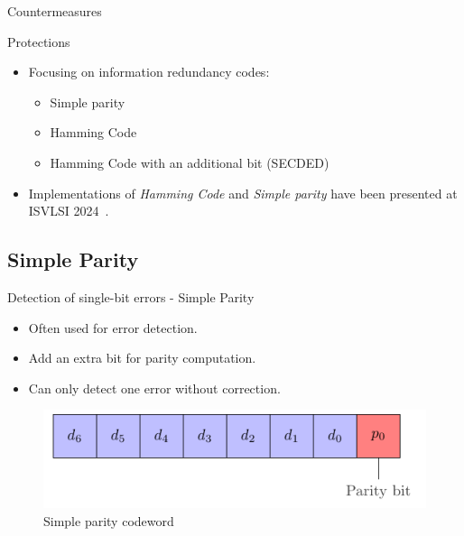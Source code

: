 \begin{frame}{Countermeasures}
    \begin{block}{Protections}
        \begin{itemize}
            \item Focusing on information redundancy codes:
            \begin{itemize}
                \item Simple parity
                \item Hamming Code
                \item Hamming Code with an additional bit (SECDED)
            \end{itemize}
            \item Implementations of \textit{Hamming Code} and \textit{Simple parity} have been presented at ISVLSI 2024~\cite{PRLG-24-isvlsi}.
        \end{itemize}
    \end{block}
\end{frame}
\subsection{Simple Parity}
    \begin{frame}{Detection of single-bit errors - Simple Parity}
        \begin{block}{}
            \begin{itemize}
                \justifying
                \item Often used for error detection.
                \item Add an extra bit for parity computation.
                \item Can only detect one error without correction.
            \end{itemize}
        \end{block}

        \vfill
        
        \begin{figure}
            \centering
            \includegraphics[width=.5\textwidth, page=1]{src/4_strategies/img/simple_parity.pdf}
            \caption{Simple parity codeword}
            \label{fig:simple_parity_codeword}
        \end{figure}
    \end{frame}
